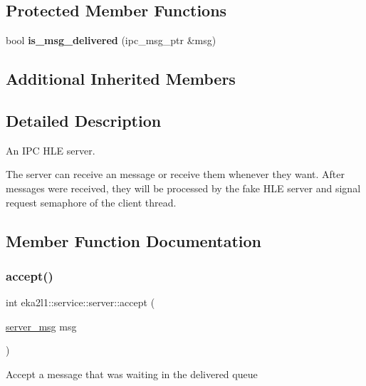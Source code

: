 \subsection*{Protected Member Functions}
\begin{DoxyCompactItemize}
\item 
\mbox{\label{classeka2l1_1_1service_1_1server_a530fa6bf8c6d45a3b06e8162cb031e4c}} 
bool {\bfseries is\+\_\+msg\+\_\+delivered} (ipc\+\_\+msg\+\_\+ptr \&msg)
\end{DoxyCompactItemize}
\subsection*{Additional Inherited Members}


\subsection{Detailed Description}
An I\+PC H\+LE server. 

The server can receive an message or receive them whenever they want. After messages were received, they will be processed by the fake H\+LE server and signal request semaphore of the client thread. 

\subsection{Member Function Documentation}
\mbox{\label{classeka2l1_1_1service_1_1server_a91c56400274a88fc0e3334cc5b03fdff}} 
\subsubsection{\texorpdfstring{accept()}{accept()}}
{\footnotesize\ttfamily int eka2l1\+::service\+::server\+::accept (\begin{DoxyParamCaption}\item[{\mbox{\hyperlink{structeka2l1_1_1service_1_1server__msg}{server\+\_\+msg}}}]{msg }\end{DoxyParamCaption})}

Accept a message that was waiting in the delivered queue \mbox{\label{classeka2l1_1_1service_1_1server_a14b31a4fdb52c29872317145254a1b4a}} 
